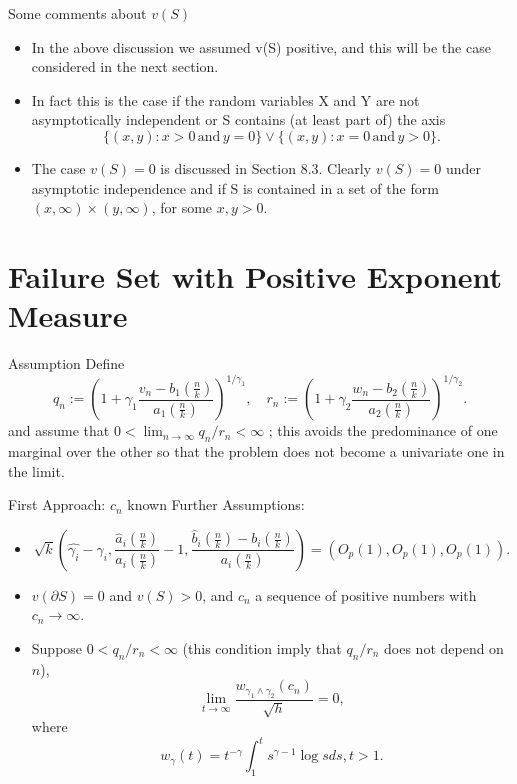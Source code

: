 \documentclass[11pt]{beamer}
\begin{document}
\begin{frame}{Some comments about $v(S)$}
\begin{itemize}
\item In the above discussion we assumed v(S) positive, and this will be the case considered in the next section.
\item In fact this is the case
if the random variables X and Y are not asymptotically independent or S contains (at
least part of) the axis
\begin{equation}\tag{8.1.12}
\{ (x,y):x>0 \, \text{and} \, y=0\} \lor \{ (x,y):x=0 \, \text{and} \, y>0\}.
\end{equation}
\item The case $v(S)=0$ is discussed in Section 8.3. Clearly $v(S)=0$ under asymptotic
independence and if S is contained in a set of the form $(x,\infty) \times (y,\infty)$, for some $x,y>0$.
\end{itemize}
\end{frame}

\section{Failure Set with Positive Exponent Measure}
\begin{frame}{Assumption}
 Define
\begin{displaymath}
q_n:=(1+\gamma_1 \frac{v_n-b_1(\frac{n}{k})}{a_1(\frac{n}{k})})^{1/\gamma_1},\quad r_n:=(1+\gamma_2 \frac{w_n-b_2(\frac{n}{k})}{a_2(\frac{n}{k})})^{1/\gamma_2}.
\end{displaymath}
and assume that $0<\lim_{n\to \infty} q_n/r_n<\infty$  ; this avoids the predominance of
one marginal over the other so that the problem does not become a univariate one in
the limit.
\end{frame}



\begin{frame}{First Approach: $c_n$ known}
Further Assumptions:
\begin{itemize}
\item 
\begin{displaymath}
\sqrt{k}(\hat{\gamma_i}-\gamma_i, \frac{\hat{a}_i(\frac{n}{k})}{a_i(\frac{n}{k})}-1, \dfrac{\hat{b}_i(\frac{n}{k})-b_i(\frac{n}{k})}{a_i(\frac{n}{k})})=(O_p(1),O_p(1),O_p(1)).
\end{displaymath}
\item $v(\partial S)=0$ and $v(S)>0$, and $c_n$ a sequence of positive numbers with $c_n\to \infty$.
\item Suppose $0<q_n/r_n<\infty$ (this condition imply that $q_n/r_n$ does not depend on $n$),
\begin{equation}\tag{8.2.5}
\lim_{t\to \infty} \frac{w_{\gamma_1 \land \gamma_2}(c_n)}{\sqrt{h}}=0,
\end{equation}
where
\begin{displaymath}
w_{\gamma}(t)=t^{-\gamma}\int_{1}^t s^{\gamma-1}\log s ds, t>1.
\end{displaymath}
\end{itemize}
\end{frame}
\end{document}
